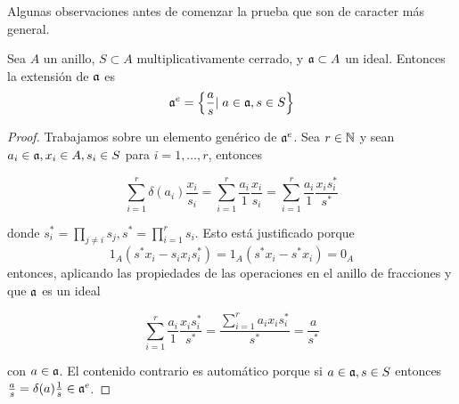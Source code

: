 \documentclass[../main.tex]{subfiles}
\begin{document}
Algunas observaciones antes de comenzar la prueba que son de caracter más general.

\begin{lemma}
	Sea $A$ un anillo, $S \subset A$ multiplicativamente cerrado, y  $\mathfrak{a} \subset A$ un ideal. Entonces la extensión de $\mathfrak{a}$ es
	\begin{equation}
		\mathfrak{a}^e = \left \{ \frac{a}{s} \vert \; a\in \mathfrak{a}, s \in S \right\}
	\end{equation}

\end{lemma}
\begin{proof}
	Trabajamos sobre un elemento genérico de $\mathfrak{a}^e$. Sea $r\in\mathbb{N}$ y sean $a_i \in \mathfrak{a}, x_i \in A, s_i \in S$ para $i=1,\dots, r$, entonces

	$$
		\sum_{i=1}^r \delta(a_i) \frac{x_i}{s_i} = \sum_{i=1}^r \frac{a_i}{1}\frac{x_i}{s_i} = \sum_{i=1}^r \frac{a_i}{1}\frac{x_i s_i^*}{s^*}
	$$

	donde $ s_i^* = \prod_{j\neq i}s_j, s^* = \prod_{i=1}^r s_i$. Esto está justificado porque
	$$
		1_A(s^* x_i - s_i x_is_i^*) =	1_A(s^* x_i - s^*x_i) = 0_A
	$$
	entonces, aplicando las propiedades de las operaciones en el anillo de fracciones y que $\mathfrak{a}$ es un ideal

	$$
	 \sum_{i=1}^r \frac{a_i}{1}\frac{x_i s_i^*}{s^*} = \frac{\sum_{i=1}^r a_i x_i s_i^* }{s^*} = \frac{a}{s^*}
	$$

	con $a \in \mathfrak{a}$. El contenido contrario es automático porque si $a\in \mathfrak{a}, s\in  S$ entonces $\frac{a}{s} = \delta(a)\frac{1}{s} \in \mathfrak{a}^e$.
\end{proof}
\end{document}
